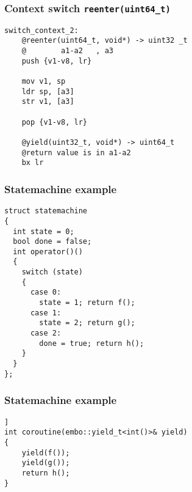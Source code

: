 \documentclass{beamer}
\begin{document}
\begin{frame}[fragile]
\frametitle{Context switch \lstinline{reenter(uint64_t)}}
\begin{block}{\vspace*{-3.2ex}}
\begin{lstlisting}[language=ASM, basicstyle=\small]
switch_context_2:
    @reenter(uint64_t, void*) -> uint32	_t
    @        a1-a2   , a3
    push {v1-v8, lr}

    mov v1, sp
    ldr sp, [a3]
    str v1, [a3]

    pop {v1-v8, lr}

    @yield(uint32_t, void*) -> uint64_t
    @return value is in a1-a2
    bx lr
\end{lstlisting}
\end{block}
\end{frame}



\begin{frame}[fragile]
\frametitle{Statemachine example}
\vspace*{-3ex}
\begin{block}{\vspace*{-3.2ex}}
\begin{lstlisting}[basicstyle=\small]
struct statemachine
{
  int state = 0;
  bool done = false;
  int operator()()
  {
    switch (state)
    {
      case 0:        
        state = 1; return f();
      case 1:
        state = 2; return g(); 
      case 2:
        done = true; return h();
    }
  }
};
\end{lstlisting}
\end{block}
\end{frame}

\begin{frame}[fragile]
\frametitle{Statemachine example}
\begin{block}{\vspace*{-3.2ex}}
\begin{lstlisting}[basicstyle=\small]]
int coroutine(embo::yield_t<int()>& yield)
{
    yield(f());
    yield(g());
    return h();
}
\end{lstlisting}
\end{block}
\end{frame}
\end{document}
